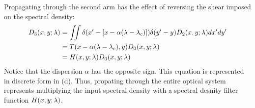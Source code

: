 Propagating through the second arm has the effect of reversing the shear imposed on the spectral density:
%
\begin{equation}
\begin{split}
	D_3 \ap{x,y;\lambda} & = \iint  \delta \ap{x^\prime - \left[ x - \alpha \ap{\lambda - \lambda_c} \right]} \delta \ap{y^\prime - y} D_2 \ap{x,y;\lambda} dx^\prime dy^\prime \\
	& = T \ap{x - \alpha\ap{\lambda - \lambda_c},y} D_0 \ap{x,y;\lambda} \\
	& = H \ap{x,y;\lambda} D_0 \ap{x,y;\lambda}
	\label{eq:afssicFilter}
\end{split}
\end{equation}
%
Notice that the dispersion $\alpha$ has the opposite sign. This equation is represented in discrete form in (d). Thus, propating through the entire optical system represents multiplying the input spectral density with a spectral desnity filter function $H \ap{x,y;\lambda}$. 

